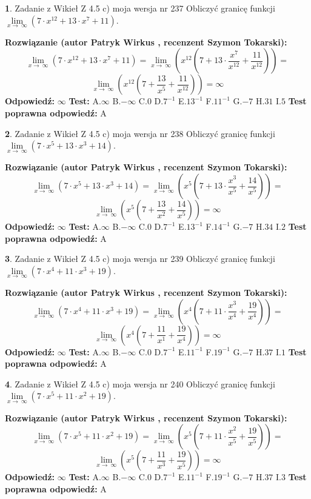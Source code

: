 \documentclass[12pt, a4paper]{article}
\theoremstyle{definition} %
\newtheorem{zad}{}
\newcommand{\zadStart}[1]{\begin{zad}#1\newline}
\newcommand{\zadStop}{\end{zad}}
\newcommand{\rozwStart}[2]{\noindent \textbf{Rozwiązanie (autor #1 , recenzent #2): }\newline}
\newcommand{\rozwStop}{\newline}
\newcommand{\odpStart}{\noindent \textbf{Odpowiedź:}\newline}
\newcommand{\odpStop}{\newline}
\newcommand{\testStart}{\noindent \textbf{Test:}\newline}
\newcommand{\testStop}{\newline}
\newcommand{\kluczStart}{\noindent \textbf{Test poprawna odpowiedź:}\newline}
\newcommand{\kluczStop}{\newline}
\begin{document}
\zadStart{Zadanie z Wikieł Z 4.5 c) moja wersja nr 237}
Obliczyć granicę funkcji  $\lim\limits_{x\to\ \infty}(7 \cdot x^{12}+13 \cdot x^{7}+11)$.
\zadStop
\rozwStart{Patryk Wirkus}{Szymon Tokarski}
$$\lim\limits_{x\to\ \infty}(7 \cdot x^{12}+13 \cdot x^{7}+11) = \lim\limits_{x\to\ \infty}(x^{12}(7 +13 \cdot \frac{x^{7}}{x^{12}}+\frac{11}{x^{12}})) =$$ $$\lim\limits_{x\to\ \infty}(x^{12}(7 +\frac{13}{x^{5}}+\frac{11}{x^{12}})) =\infty$$
\rozwStop
\odpStart
$\infty$
\odpStop
\testStart
A.$\infty$ B.$-\infty$ C.$0$ D.$7^{-1}$ E.$13^{-1}$
F.$11^{-1}$ G.$-7$
H.$31$
I.$5$
\testStop
\kluczStart
A
\kluczStop



\zadStart{Zadanie z Wikieł Z 4.5 c) moja wersja nr 238}
Obliczyć granicę funkcji  $\lim\limits_{x\to\ \infty}(7 \cdot x^{5}+13 \cdot x^{3}+14)$.
\zadStop
\rozwStart{Patryk Wirkus}{Szymon Tokarski}
$$\lim\limits_{x\to\ \infty}(7 \cdot x^{5}+13 \cdot x^{3}+14) = \lim\limits_{x\to\ \infty}(x^{5}(7 +13 \cdot \frac{x^{3}}{x^{5}}+\frac{14}{x^{5}})) =$$ $$\lim\limits_{x\to\ \infty}(x^{5}(7 +\frac{13}{x^{2}}+\frac{14}{x^{5}})) =\infty$$
\rozwStop
\odpStart
$\infty$
\odpStop
\testStart
A.$\infty$ B.$-\infty$ C.$0$ D.$7^{-1}$ E.$13^{-1}$
F.$14^{-1}$ G.$-7$
H.$34$
I.$2$
\testStop
\kluczStart
A
\kluczStop



\zadStart{Zadanie z Wikieł Z 4.5 c) moja wersja nr 239}
Obliczyć granicę funkcji  $\lim\limits_{x\to\ \infty}(7 \cdot x^{4}+11 \cdot x^{3}+19)$.
\zadStop
\rozwStart{Patryk Wirkus}{Szymon Tokarski}
$$\lim\limits_{x\to\ \infty}(7 \cdot x^{4}+11 \cdot x^{3}+19) = \lim\limits_{x\to\ \infty}(x^{4}(7 +11 \cdot \frac{x^{3}}{x^{4}}+\frac{19}{x^{4}})) =$$ $$\lim\limits_{x\to\ \infty}(x^{4}(7 +\frac{11}{x^{1}}+\frac{19}{x^{4}})) =\infty$$
\rozwStop
\odpStart
$\infty$
\odpStop
\testStart
A.$\infty$ B.$-\infty$ C.$0$ D.$7^{-1}$ E.$11^{-1}$
F.$19^{-1}$ G.$-7$
H.$37$
I.$1$
\testStop
\kluczStart
A
\kluczStop



\zadStart{Zadanie z Wikieł Z 4.5 c) moja wersja nr 240}
Obliczyć granicę funkcji  $\lim\limits_{x\to\ \infty}(7 \cdot x^{5}+11 \cdot x^{2}+19)$.
\zadStop
\rozwStart{Patryk Wirkus}{Szymon Tokarski}
$$\lim\limits_{x\to\ \infty}(7 \cdot x^{5}+11 \cdot x^{2}+19) = \lim\limits_{x\to\ \infty}(x^{5}(7 +11 \cdot \frac{x^{2}}{x^{5}}+\frac{19}{x^{5}})) =$$ $$\lim\limits_{x\to\ \infty}(x^{5}(7 +\frac{11}{x^{3}}+\frac{19}{x^{5}})) =\infty$$
\rozwStop
\odpStart
$\infty$
\odpStop
\testStart
A.$\infty$ B.$-\infty$ C.$0$ D.$7^{-1}$ E.$11^{-1}$
F.$19^{-1}$ G.$-7$
H.$37$
I.$3$
\testStop
\kluczStart
A
\kluczStop
\end{document}
